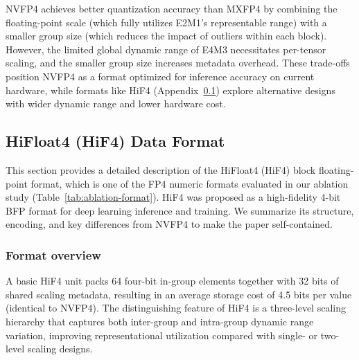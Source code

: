 \documentclass{article}
\begin{document}
NVFP4 achieves better quantization accuracy than MXFP4 by combining the
floating-point scale (which fully utilizes E2M1's representable range) with a
smaller group size (which reduces the impact of outliers within each block).
However, the limited global dynamic range of E4M3 necessitates per-tensor
scaling, and the smaller group size increases metadata overhead. These
trade-offs position NVFP4 as a format optimized for inference accuracy on
current hardware, while formats like HiF4 (Appendix~\ref{app:hif4}) explore
alternative designs with wider dynamic range and lower hardware cost.

\subsection{HiFloat4 (HiF4) Data Format}
\label{app:hif4}

This section provides a detailed description of the HiFloat4 (HiF4) block
floating-point format, which is one of the FP4 numeric formats evaluated in our
ablation study (Table~\ref{tab:ablation-format}). HiF4 was proposed as a
high-fidelity 4-bit BFP format for deep learning inference and training. We
summarize its structure, encoding, and key differences from NVFP4 to make the
paper self-contained.

\subsubsection{Format overview}

A basic HiF4 unit packs 64 four-bit in-group elements together with 32 bits of
shared scaling metadata, resulting in an average storage cost of 4.5 bits per
value (identical to NVFP4). The distinguishing feature of HiF4 is a three-level
scaling hierarchy that captures both inter-group and intra-group dynamic range
variation, improving representational utilization compared with single- or
two-level scaling designs.

\end{document}

